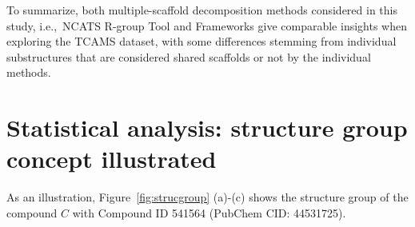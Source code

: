 \documentclass[11pt,letterpaper]{article}
\newcommand*\fref[1]{Figure~\ref{fig:#1}}
\newcommand*\sref[1]{Section~\ref{sec:#1}}
\newcommand*\ie{i.e.,~}
\begin{document}
To summarize, both multiple-scaffold decomposition methods considered in this study, \ie NCATS R-group Tool and Frameworks give comparable insights when exploring the TCAMS dataset, with some differences stemming from individual substructures that are considered shared scaffolds or not by the individual methods.

\newpage
\section{Statistical analysis: structure group concept illustrated}
\label{sec:strucgroup}
As an illustration, \fref{strucgroup} (a)-(c) shows the structure group of the compound $C$ with Compound ID 541564 (PubChem CID: 44531725). 
\end{document}

